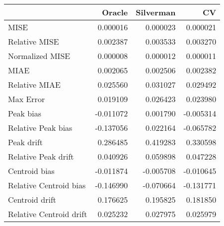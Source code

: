 \begin{tabular}{lrrr}
  \hline
 & Oracle & Silverman & CV \\ 
  \hline
MISE & 0.000016 & 0.000023 & 0.000021 \\ 
  Relative MISE & 0.002387 & 0.003533 & 0.003270 \\ 
  Normalized MISE & 0.000008 & 0.000012 & 0.000011 \\ 
  MIAE & 0.002065 & 0.002506 & 0.002382 \\ 
  Relative MIAE & 0.025560 & 0.031027 & 0.029492 \\ 
  Max Error & 0.019109 & 0.026423 & 0.023980 \\ 
  Peak bias & -0.011072 & 0.001790 & -0.005314 \\ 
  Relative Peak bias & -0.137056 & 0.022164 & -0.065782 \\ 
  Peak drift & 0.286485 & 0.419283 & 0.330598 \\ 
  Relative Peak drift & 0.040926 & 0.059898 & 0.047228 \\ 
  Centroid bias & -0.011874 & -0.005708 & -0.010645 \\ 
  Relative Centroid bias & -0.146990 & -0.070664 & -0.131771 \\ 
  Centroid drift & 0.176625 & 0.195825 & 0.181850 \\ 
  Relative Centroid drift & 0.025232 & 0.027975 & 0.025979 \\ 
   \hline
\end{tabular}
